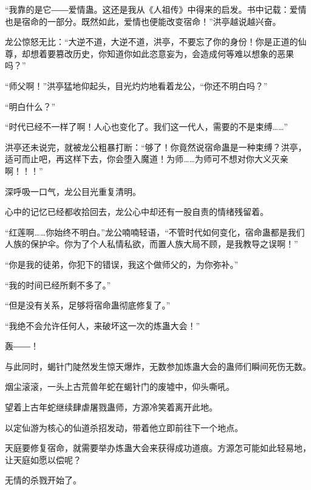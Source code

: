 \begin{this_body}
“我靠的是它――爱情蛊。这还是我从《人祖传》中得来的启发。书中记载：爱情也是宿命的一部分。既然如此，爱情也便能改变宿命！”洪亭越说越兴奋。

龙公惊怒无比：“大逆不道，大逆不道，洪亭，不要忘了你的身份！你是正道的仙尊，却想着要篡改历史，你知道你如此恣意妄为，会造成何等难以想象的恶果吗？”

“师父啊！”洪亭猛地仰起头，目光灼灼地看着龙公，“你还不明白吗？”

“明白什么？”

“时代已经不一样了啊！人心也变化了。我们这一代人，需要的不是束缚……”

洪亭还未说完，就被龙公粗暴打断：“够了！你竟然说宿命蛊是一种束缚？洪亭，适可而止吧，再这样下去，你会堕入魔道！为师……为师可不想对你大义灭亲啊！！！”

深呼吸一口气，龙公目光重复清明。

心中的记忆已经都收拾回去，龙公心中却还有一股自责的情绪残留着。

“红莲啊……你始终不明白。”龙公喃喃轻语，“不管时代如何变化，宿命蛊都是我们人族的保护伞。你为了个人私情私欲，而置人族大局不顾，是我教导之误啊！”

“你是我的徒弟，你犯下的错误，我这个做师父的，为你弥补。”

“我的时间已经所剩不多了。”

“但是没有关系，足够将宿命蛊彻底修复了。”

“我绝不会允许任何人，来破坏这一次的炼蛊大会！”

轰――！

与此同时，蝎针门陡然发生惊天爆炸，无数参加炼蛊大会的蛊师们瞬间死伤无数。

烟尘滚滚，一头上古荒兽年蛇在蝎针门的废墟中，仰头嘶吼。

望着上古年蛇继续肆虐屠戮蛊师，方源冷笑着离开此地。

以定仙游为核心的仙道杀招发动，带着他立即前往下一个地点。

天庭要修复宿命，就需要举办炼蛊大会来获得成功道痕。方源怎可能如此轻易地，让天庭如愿以偿呢？

无情的杀戮开始了。

\end{this_body}

